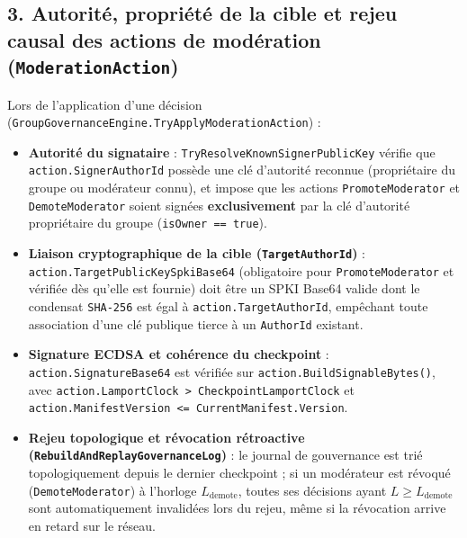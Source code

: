 \documentclass[11pt,a4paper]{article}
\begin{document}
\subsection{3. Autorité, propriété de la cible et rejeu causal des actions de modération (\texttt{ModerationAction})}
Lors de l'application d'une décision (\texttt{GroupGovernanceEngine.TryApplyModerationAction}) :
\begin{itemize}
    \item \textbf{Autorité du signataire} : \texttt{TryResolveKnownSignerPublicKey} vérifie que \texttt{action.SignerAuthorId} possède une clé d'autorité reconnue (propriétaire du groupe ou modérateur connu), et impose que les actions \texttt{PromoteModerator} et \texttt{DemoteModerator} soient signées \textbf{exclusivement} par la clé d'autorité propriétaire du groupe (\texttt{isOwner == true}).
    \item \textbf{Liaison cryptographique de la cible (\texttt{TargetAuthorId})} : \texttt{action.TargetPublicKeySpkiBase64} (obligatoire pour \texttt{PromoteModerator} et vérifiée dès qu'elle est fournie) doit être un SPKI Base64 valide dont le condensat \texttt{SHA-256} est égal à \texttt{action.TargetAuthorId}, empêchant toute association d'une clé publique tierce à un \texttt{AuthorId} existant.
    \item \textbf{Signature ECDSA et cohérence du checkpoint} : \texttt{action.SignatureBase64} est vérifiée sur \texttt{action.BuildSignableBytes()}, avec \texttt{action.LamportClock > CheckpointLamportClock} et \texttt{action.ManifestVersion <= CurrentManifest.Version}.
    \item \textbf{Rejeu topologique et révocation rétroactive (\texttt{RebuildAndReplayGovernanceLog})} : le journal de gouvernance est trié topologiquement depuis le dernier checkpoint ; si un modérateur est révoqué (\texttt{DemoteModerator}) à l'horloge $L_{\mathrm{demote}}$, toutes ses décisions ayant $L \ge L_{\mathrm{demote}}$ sont automatiquement invalidées lors du rejeu, même si la révocation arrive en retard sur le réseau.
\end{itemize}
\end{document}
